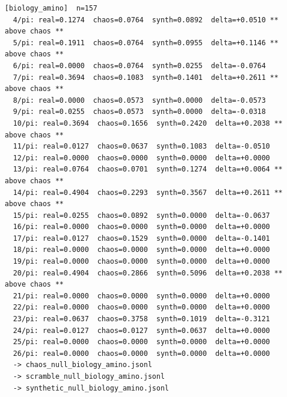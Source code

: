 \documentclass[11pt, letterpaper, openany]{book}
\begin{document}
\begin{empiricalbox}
\begin{lstlisting}[style=terminal]
[biology_amino]  n=157
  4/pi: real=0.1274  chaos=0.0764  synth=0.0892  delta=+0.0510 ** above chaos **
  5/pi: real=0.1911  chaos=0.0764  synth=0.0955  delta=+0.1146 ** above chaos **
  6/pi: real=0.0000  chaos=0.0764  synth=0.0255  delta=-0.0764
  7/pi: real=0.3694  chaos=0.1083  synth=0.1401  delta=+0.2611 ** above chaos **
  8/pi: real=0.0000  chaos=0.0573  synth=0.0000  delta=-0.0573
  9/pi: real=0.0255  chaos=0.0573  synth=0.0000  delta=-0.0318
  10/pi: real=0.3694  chaos=0.1656  synth=0.2420  delta=+0.2038 ** above chaos **
  11/pi: real=0.0127  chaos=0.0637  synth=0.1083  delta=-0.0510
  12/pi: real=0.0000  chaos=0.0000  synth=0.0000  delta=+0.0000
  13/pi: real=0.0764  chaos=0.0701  synth=0.1274  delta=+0.0064 ** above chaos **
  14/pi: real=0.4904  chaos=0.2293  synth=0.3567  delta=+0.2611 ** above chaos **
  15/pi: real=0.0255  chaos=0.0892  synth=0.0000  delta=-0.0637
  16/pi: real=0.0000  chaos=0.0000  synth=0.0000  delta=+0.0000
  17/pi: real=0.0127  chaos=0.1529  synth=0.0000  delta=-0.1401
  18/pi: real=0.0000  chaos=0.0000  synth=0.0000  delta=+0.0000
  19/pi: real=0.0000  chaos=0.0000  synth=0.0000  delta=+0.0000
  20/pi: real=0.4904  chaos=0.2866  synth=0.5096  delta=+0.2038 ** above chaos **
  21/pi: real=0.0000  chaos=0.0000  synth=0.0000  delta=+0.0000
  22/pi: real=0.0000  chaos=0.0000  synth=0.0000  delta=+0.0000
  23/pi: real=0.0637  chaos=0.3758  synth=0.1019  delta=-0.3121
  24/pi: real=0.0127  chaos=0.0127  synth=0.0637  delta=+0.0000
  25/pi: real=0.0000  chaos=0.0000  synth=0.0000  delta=+0.0000
  26/pi: real=0.0000  chaos=0.0000  synth=0.0000  delta=+0.0000
  -> chaos_null_biology_amino.jsonl
  -> scramble_null_biology_amino.jsonl
  -> synthetic_null_biology_amino.jsonl


\end{lstlisting}
\end{empiricalbox}
\end{document}
